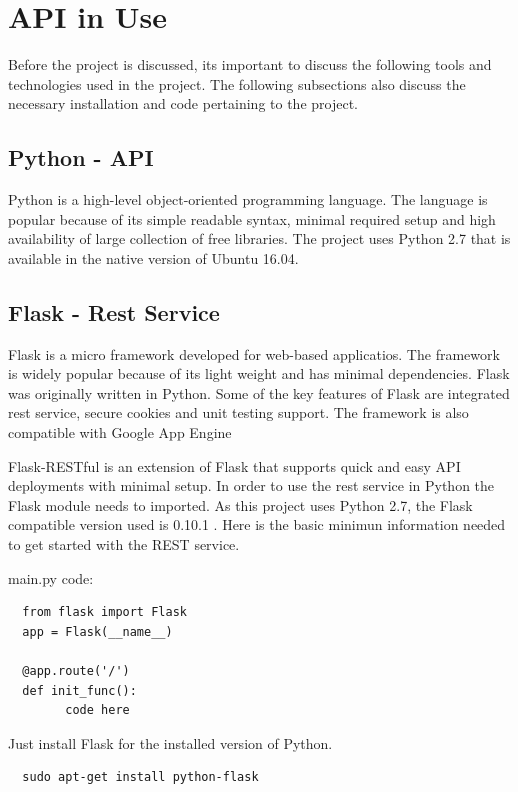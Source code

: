  
\section{API in Use}

Before the project is discussed, its important to discuss the following tools
and technologies used in the project. The following subsections also discuss
the necessary installation and code pertaining to the project.


\subsection{Python - API}
Python is a high-level object-oriented programming language. The language is
popular because of its simple readable syntax, minimal required setup and high
availability of large collection of free libraries. The project uses Python
2.7 that is available in the native version of Ubuntu 16.04.

\subsection{Flask - Rest Service}
Flask is a micro framework developed for web-based applicatios. The framework
is widely popular because of its light weight and has minimal dependencies.
Flask was originally written in Python. Some of the key features of Flask are
integrated rest service, secure cookies and unit testing support. The
framework is also compatible with Google App
Engine~\cite{hid-sp18-417-google_appengine}

Flask-RESTful is an extension of Flask that supports quick and easy API
deployments with minimal setup. In order to use the rest service in Python the
Flask module needs to imported. As this project uses Python 2.7, the Flask
compatible version used is 0.10.1 . Here is the basic minimun information
needed to get started with the REST service.

main.py code:

\begin{verbatim}
  from flask import Flask
  app = Flask(__name__)

  @app.route('/')
  def init_func():
        code here
\end{verbatim}

Just install Flask for the installed version of Python.

\begin{verbatim}
  sudo apt-get install python-flask
\end{verbatim}

